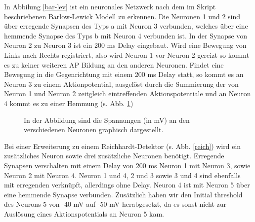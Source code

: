 \documentclass[11pt]{article}
\begin{document}
In Abbilung \ref{bar-lev} ist ein neuronales Netzwerk nach dem im Skript beschriebenen Barlow-Lewick Modell zu erkennen. Die Neuronen 1 und 2 sind über erregende Synapsen des Typs a mit Neuron 3 verbunden, welches über eine hemmende Synapse des Typs b mit Neuron 4 verbunden ist. In der Synapse von Neuron 2 zu Neuron 3 ist ein 200 ms Delay eingebaut. Wird eine Bewegung von Links nach Rechts registriert, also wird Neuron 1 vor Neuron 2 gereizt so kommt es zu keiner weiteren AP Bildung an den anderen Neuronen. Findet eine Bewegung in die Gegenrichtung mit einem 200 ms Delay statt, so kommt es an Neuron 3 zu einem Aktionpotential, ausgelöst durch die Summierung der von Neuron 1 und Neuron 2 zeitgleich eintreffenden Aktionspotentiale und an Neuron 4 kommt es zu einer Hemmung (s. Abb. \ref{hemm})

\begin{figure}[H]
\caption{In der Abbildung sind die Spannungen (in mV) an den verschiedenen Neuronen graphisch dargestellt.}
\label{hemm}
\end{figure}

Bei einer Erweiterung zu einem Reichhardt-Detektor (s. Abb. \ref{reich}) wird ein zusätzliches Neuron sowie drei zusätzliche Neuronen benötigt. Erregende Synapsen verschalten mit einem Delay von 200 ms Neuron 1 mit Neuron 3, sowie Neuron 2 mit Neuron 4. Neuron 1 und 4,  2 und 3 sowie 3 und 4 sind ebenfalls mit erregenden verknüpft, allerdings ohne Delay. Neuron 4 ist mit Neuron 5 über eine hemmende Synapse verbunden. Zusätzlich haben wir den Initial threshold des Neurons 5 von -40 mV auf -50 mV herabgesetzt, da es sonst nicht zur Auslösung eines Aktionspotentials an Neuron 5 kam. 
\end{document}

